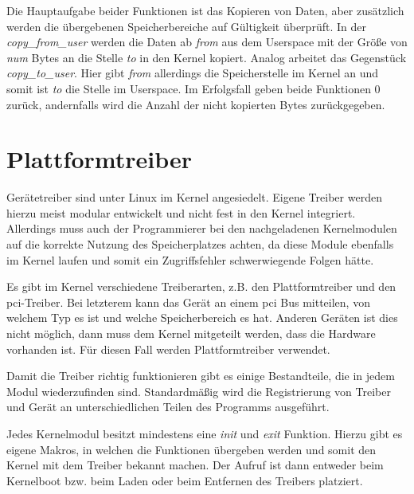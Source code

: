 Die Hauptaufgabe beider Funktionen ist das Kopieren von Daten, aber zusätzlich werden die übergebenen Speicherbereiche auf Gültigkeit überprüft. 
In der \textit{copy\_from\_user} werden die Daten ab \textit{from} aus dem Userspace mit der Größe von \textit{num} Bytes an die Stelle \textit{to} in den Kernel kopiert.
Analog arbeitet das Gegenstück \textit{copy\_to\_user}. Hier gibt \textit{from} allerdings die Speicherstelle im Kernel an und somit ist \textit{to} die Stelle im Userspace.
Im Erfolgsfall geben beide Funktionen 0 zurück, andernfalls wird die Anzahl der nicht kopierten Bytes zurückgegeben. \citep[S. 250f.]{schroder2009embedded}%

\section{Plattformtreiber}\label{sec:plat_t}
Gerätetreiber sind unter Linux im Kernel angesiedelt. Eigene Treiber werden hierzu meist modular entwickelt und nicht fest in den Kernel integriert. Allerdings muss auch der Programmierer bei den nachgeladenen Kernelmodulen auf die korrekte Nutzung des Speicherplatzes achten, da diese Module ebenfalls im Kernel laufen und somit ein Zugriffsfehler schwerwiegende Folgen hätte. \citep[S. 231ff.]{schroder2009embedded}%

Es gibt im Kernel verschiedene Treiberarten, z.B. den Plattformtreiber und den \ac{pci}-Treiber. Bei letzterem kann das Gerät an einem \ac{pci} Bus mitteilen, von welchem Typ es ist und welche Speicherbereich es hat. Anderen Geräten ist dies nicht möglich, dann muss dem Kernel mitgeteilt werden, dass die Hardware vorhanden ist. Für diesen Fall werden Plattformtreiber verwendet. \cite{corbet2005linux}

Damit die Treiber richtig funktionieren gibt es einige Bestandteile, die in jedem Modul wiederzufinden sind. Standardmäßig wird die Registrierung von Treiber und Gerät an unterschiedlichen Teilen des Programms ausgeführt. \cite{corbetplatform} %




Jedes Kernelmodul besitzt mindestens eine \textit{init} und \textit{exit} Funktion. Hierzu gibt es eigene Makros, in welchen die Funktionen übergeben werden und somit den Kernel mit dem Treiber bekannt machen. Der Aufruf ist dann entweder beim Kernelboot bzw. beim Laden oder beim Entfernen des Treibers platziert. \cite[module.h, Zeile 79ff.]{linuxsourceinclude}


